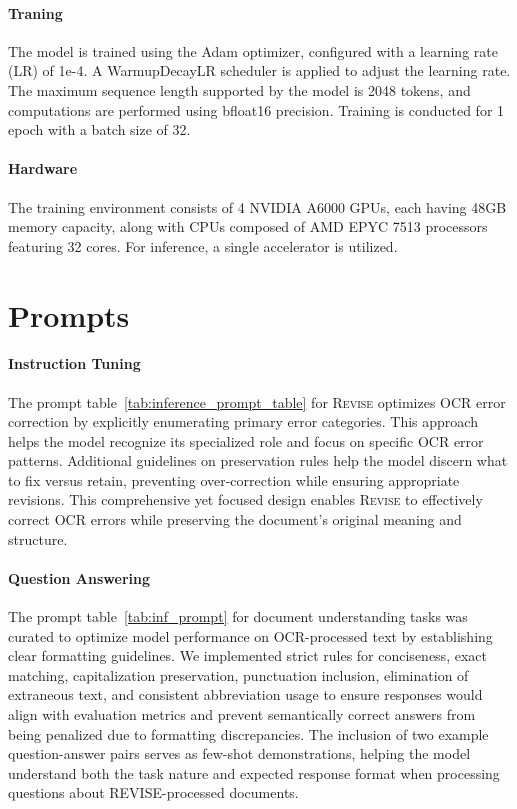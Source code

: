 \documentclass[11pt]{article}
\begin{document}
\paragraph{Traning}
The model is trained using the Adam optimizer, configured with a learning rate (LR) of 1e-4. A WarmupDecayLR scheduler is applied to adjust the learning rate. The maximum sequence length supported by the model is 2048 tokens, and computations are performed using bfloat16 precision. Training is conducted for 1 epoch with a batch size of 32. 


\paragraph{Hardware}
The training environment consists of 4 NVIDIA A6000 GPUs, each having 48GB memory capacity, along with CPUs composed of AMD EPYC 7513 processors featuring 32 cores. For inference, a single accelerator is utilized.

\section{Prompts}


\paragraph{Instruction Tuning}

The prompt table~\ref{tab:inference_prompt_table} for \textsc{Revise} optimizes OCR error correction by explicitly enumerating primary error categories. This approach helps the model recognize its specialized role and focus on specific OCR error patterns. Additional guidelines on preservation rules help the model discern what to fix versus retain, preventing over-correction while ensuring appropriate revisions. This comprehensive yet focused design enables \textsc{Revise} to effectively correct OCR errors while preserving the document's original meaning and structure.


\paragraph{Question Answering}

The prompt table~\ref{tab:inf_prompt} for document understanding tasks was curated to optimize model performance on OCR-processed text by establishing clear formatting guidelines. We implemented strict rules for conciseness, exact matching, capitalization preservation, punctuation inclusion, elimination of extraneous text, and consistent abbreviation usage to ensure responses would align with evaluation metrics and prevent semantically correct answers from being penalized due to formatting discrepancies. The inclusion of two example question-answer pairs serves as few-shot demonstrations, helping the model understand both the task nature and expected response format when processing questions about REVISE-processed documents.
\end{document}
